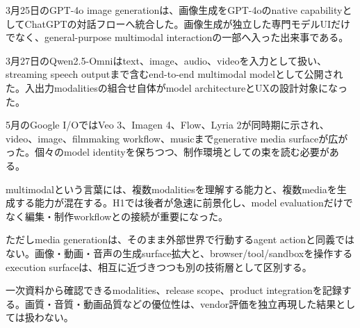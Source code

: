 
3月25日のGPT-4o image generationは、画像生成をGPT-4oのnative capabilityとしてChatGPTの対話フローへ統合した。画像生成が独立した専門モデルUIだけでなく、general-purpose multimodal interactionの一部へ入った出来事である。\autocite{src-877e7da88408}


3月27日のQwen2.5-Omniはtext、image、audio、videoを入力として扱い、streaming speech outputまで含むend-to-end multimodal modelとして公開された。入出力modalitiesの組合せ自体がmodel architectureとUXの設計対象になった。\autocite{src-de4ffd746276}


5月のGoogle I/OではVeo 3、Imagen 4、Flow、Lyria 2が同時期に示され、video、image、filmmaking workflow、musicまでgenerative media surfaceが広がった。個々のmodel identityを保ちつつ、制作環境としての束を読む必要がある。\autocite{src-e68f8ce96685}


multimodalという言葉には、複数modalitiesを理解する能力と、複数mediaを生成する能力が混在する。H1では後者が急速に前景化し、model evaluationだけでなく編集・制作workflowとの接続が重要になった。\autocite{src-877e7da88408,src-de4ffd746276,src-e68f8ce96685}


ただしmedia generationは、そのまま外部世界で行動するagent actionと同義ではない。画像・動画・音声の生成surface拡大と、browser/tool/sandboxを操作するexecution surfaceは、相互に近づきつつも別の技術層として区別する。\autocite{src-877e7da88408,src-e68f8ce96685}


\begin{claimboundary}
一次資料から確認できるmodalities、release scope、product integrationを記録する。画質・音質・動画品質などの優位性は、vendor評価を独立再現した結果としては扱わない。
\end{claimboundary}
